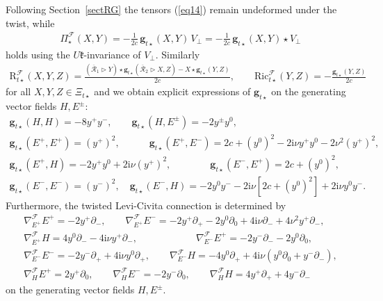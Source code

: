 \documentclass[a4paper,11pt]{article}
\begin{document}
Following Section~\ref{sectRG} the tensors (\ref{eq14}) remain undeformed under the
twist, while
\begin{align*}
\Pi^\mathcal{F}_\star(X,Y)=-\frac {1}{2c}\,\mathbf{g}_{t\star}(X,Y)\,V_\perp=-\frac {1}{2c}\,\mathbf{g}_{t\star}(X,Y)\star V_\perp
\end{align*}
holds using the $U\mathfrak{k}$-invariance of $V_\perp$. 
Similarly
\begin{align*}
\mathrm{R}^\mathcal{F}_{t\star}(X,Y,Z)=
\frac{(\overline{\mathcal{R}}_1\rhd Y) \star\mathbf{g}_{t\star}(\overline{\mathcal{R}}_2\rhd  X,Z)-X\star \mathbf{g}_{t\star}(Y,Z)}{2c},\qquad \mathrm{Ric}^\mathcal{F}_{t\star}(Y,Z)
=-\frac {\mathbf{g}_{t\star}(Y,Z)}{2c}  
\end{align*}
for all $X,Y,Z\in\Xi_{t\star}$ and we obtain explicit expressions of
$\mathbf{g}_{t\star}$ on the generating vector fields $H,E^\pm$:
\begin{align*}
\mathbf{g}_{t\star}(H,H)=-8y^+y^-, \qquad\mathbf{g}_{t\star}(H,E^\pm)=-2y^\pm y^0,\\[6pt]
\mathbf{g}_{t\star}(E^+,E^+)=(y^+)^2, \qquad\quad  \mathbf{g}_{t\star}(E^+,E^-)=2c+(y^0)^2
-2\mathrm{i}\nu y^+y^0-2\nu^2(y^+)^2, \\[6pt]
\mathbf{g}_{t\star}(E^+,H)=-2y^+y^0+2\mathrm{i}\nu (y^+)^2, \qquad\qquad \mathbf{g}_{t\star}(E^-,E^+)=2c+(y^0)^2,\\[6pt] 
\mathbf{g}_{t\star}(E^-,E^-)=(y^-)^2 ,\quad \mathbf{g}_{t\star}(E^-,H)=-2y^0y^--2\mathrm{i}\nu[2c+(y^0)^2]
+2\mathrm{i}\nu y^0y^-.
\end{align*}
Furthermore, the twisted Levi-Civita connection is determined by
%
\begin{align*}
   \nabla^\mathcal{F}_{E^+}E^+%
    =-2y^+\partial_- ,\qquad
    \nabla^\mathcal{F}_{E^+}E^-= %
    -2y^+\partial_+-2y^0\partial_0
    +4\mathrm{i}\nu\partial_-
    +4\nu^2y^+\partial_- ,\\[6pt] 
\nabla^\mathcal{F}_{E^+}H= %
    4y^0\partial_-    -4\mathrm{i}\nu y^+\partial_-    ,\qquad\qquad\qquad
    \nabla^\mathcal{F}_{E^-}E^+%
    =-2y^-\partial_--2y^0\partial_0,\\[6pt]
    \nabla^\mathcal{F}_{E^-}E^-
    =-2y^-\partial_+
    +4\mathrm{i}\nu y^0\partial_+,\qquad
    \nabla^\mathcal{F}_{E^-}H=%
    -4y^0\partial_+
    +4\mathrm{i}\nu(y^0\partial_0+y^-\partial_-),\\[6pt]
    \nabla^\mathcal{F}_HE^+=
    2y^+\partial_0,\qquad         
    \nabla^\mathcal{F}_HE^-=
    -2y^-\partial_0,\qquad 
    \nabla^\mathcal{F}_HH
    =4y^+\partial_++4y^-\partial_-
\end{align*}
on the generating vector fields $H,E^\pm$.
\end{document}
